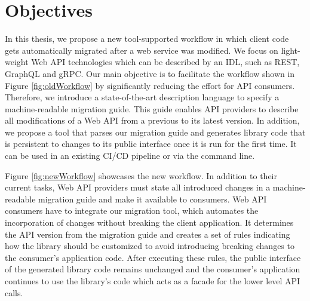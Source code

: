 \section{Objectives}
\label{sec:Objectives}

In this thesis, we propose a new tool-supported workflow in which client code gets automatically migrated after a web service was modified. We focus on light-weight Web API technologies which can be described by an IDL, such as REST, GraphQL and gRPC. Our main objective is to facilitate the workflow shown in Figure \ref{fig:oldWorkflow} by significantly reducing the effort for API consumers. Therefore, we introduce a state-of-the-art description language to specify a machine-readable migration guide. This guide enables API providers to describe all modifications of a Web API from a previous to its latest version. In addition, we propose a tool that parses our migration guide and generates library code that is persistent to changes to its public interface once it is run for the first time. It can be used in an existing \ac{CI/CD} pipeline or via the command line.

\begin{figure}[h]
\end{figure}

Figure \ref{fig:newWorkflow} showcases the new workflow. In addition to their current tasks, Web API providers must state all introduced changes in a machine-readable migration guide and make it available to consumers. Web API consumers have to integrate our migration tool, which automates the incorporation of changes without breaking the client application. It determines the API version from the migration guide and creates a set of rules indicating how the library should be customized to avoid introducing breaking changes to the consumer's application code. After executing these rules, the public interface of the generated library code remains unchanged and the consumer's application continues to use the library's code which acts as a facade for the lower level API calls.